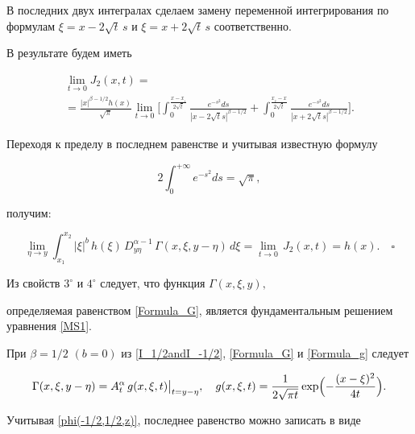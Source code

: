 В последних двух интегралах сделаем замену переменной интегрирования по формулам  $\xi=x-2\sqrt{t}\,s$ и  $\xi=x+2\sqrt{t}\,s$ соответственно. 

В результате будем иметь

\begin{multline}

\lim_{t \to 0} J_2(x,t)=

\\

=\frac{|x|^{\beta-1/2} h(x)}{\sqrt{\pi}} \lim_{t \to 0}

\biggl[ \int _{0}^{\frac{ x-x_{_1}}{2\sqrt{t}}}

\frac{e^{-s^2}ds}{|x-2\sqrt{t} s|^{\beta-1/2}}+

 \int _{0}^{\frac{ x_{_2}-x}{2\sqrt{t}}}

\frac{e^{-s^2}ds}{|x+2\sqrt{t} s|^{\beta-1/2}} \biggr].

\end{multline}

Переходя к пределу в последнем равенстве и учитывая известную формулу

$$2\int _{0}^{+\infty}e^{-s^2}ds=\sqrt{\pi},$$ 

получим:

$$

\lim_{\eta \to y} \int _{x_1}^{x_2}

|\xi|^{b}\,h(\xi)\,D^{\alpha-1}_{y\eta}\,\Gamma(x,\xi,y-\eta) \,d\xi=\lim\limits_{t \to 0}\,J_2(x,t)=h(x). \quad \square

$$



\smallskip



Из свойств \hyperlink{sv3o}{$3^\circ$}  и \hyperlink{sv4o}{$4^\circ$}  следует, что функция $\Gamma(x,\xi,y),$

определяемая равенством \eqref{Formula_G}, является фундаментальным решением уравнения \eqref{MS1}.



При $\beta=1/2$ $(b=0)$ из \eqref{I_1/2andI_-1/2}, \eqref{Formula_G} и  \eqref{Formula_g}  следует

$$

\Gamma(x,\xi,y-\eta)=A_{t}^{\alpha}\,g(x,\xi,t)\big|_{t=y-\eta},\quad 

g(x,\xi,t)=\frac{1}{2\sqrt{\pi t}}  \exp \Bigl({-\frac{(x-\xi)^2}{4t}}\Bigr).

$$

Учитывая \eqref{phi(-1/2,1/2,z)}, последнее равенство можно записать в виде

